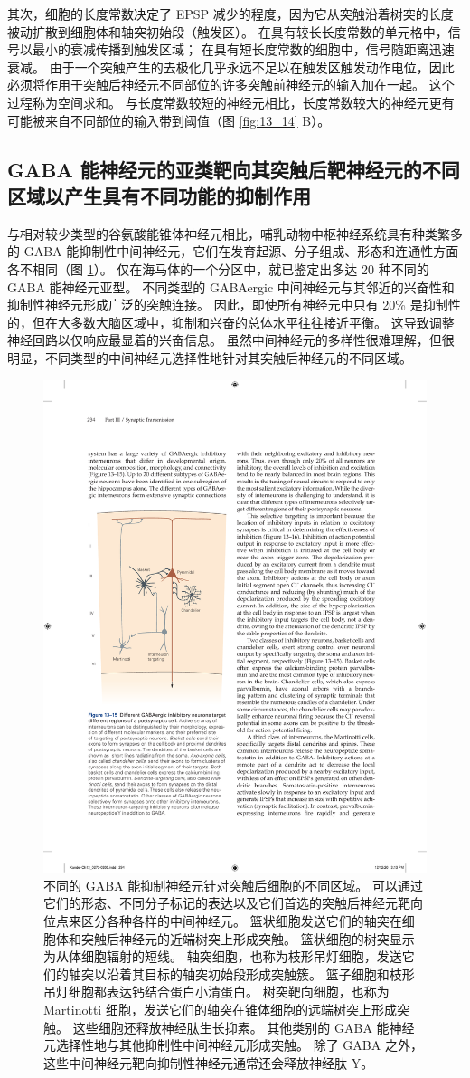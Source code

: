 其次，细胞的长度常数决定了 EPSP 减少的程度，因为它从突触沿着树突的长度被动扩散到细胞体和轴突初始段（触发区）。 
在具有较长长度常数的单元格中，信号以最小的衰减传播到触发区域； 在具有短长度常数的细胞中，信号随距离迅速衰减。 
由于一个突触产生的去极化几乎永远不足以在触发区触发动作电位，因此必须将作用于突触后神经元不同部位的许多突触前神经元的输入加在一起。 
这个过程称为空间求和。 
与长度常数较短的神经元相比，长度常数较大的神经元更有可能被来自不同部位的输入带到阈值（图 \ref{fig:13_14} B）。


\subsection{GABA 能神经元的亚类靶向其突触后靶神经元的不同区域以产生具有不同功能的抑制作用}

与相对较少类型的谷氨酸能锥体神经元相比，哺乳动物中枢神经系统具有种类繁多的 GABA 能抑制性中间神经元，它们在发育起源、分子组成、形态和连通性方面各不相同（图 \ref{fig:13_15}）。 
仅在海马体的一个分区中，就已鉴定出多达 20 种不同的 GABA 能神经元亚型。 
不同类型的 GABAergic 中间神经元与其邻近的兴奋性和抑制性神经元形成广泛的突触连接。 
因此，即使所有神经元中只有 20\% 是抑制性的，但在大多数大脑区域中，抑制和兴奋的总体水平往往接近平衡。 
这导致调整神经回路以仅响应最显着的兴奋信息。 
虽然中间神经元的多样性很难理解，但很明显，不同类型的中间神经元选择性地针对其突触后神经元的不同区域。

\begin{figure}[htbp]
	\centering
	\includegraphics[width=0.5\linewidth]{chap13/fig_13_15}
	\caption{不同的 GABA 能抑制神经元针对突触后细胞的不同区域。 可以通过它们的形态、不同分子标记的表达以及它们首选的突触后神经元靶向位点来区分各种各样的中间神经元。 篮状细胞发送它们的轴突在细胞体和突触后神经元的近端树突上形成突触。 篮状细胞的树突显示为从体细胞辐射的短线。 轴突细胞，也称为枝形吊灯细胞，发送它们的轴突以沿着其目标的轴突初始段形成突触簇。 篮子细胞和枝形吊灯细胞都表达钙结合蛋白小清蛋白。 树突靶向细胞，也称为 Martinotti 细胞，发送它们的轴突在锥体细胞的远端树突上形成突触。 这些细胞还释放神经肽生长抑素。 其他类别的 GABA 能神经元选择性地与其他抑制性中间神经元形成突触。 除了 GABA 之外，这些中间神经元靶向抑制性神经元通常还会释放神经肽 Y。}
	\label{fig:13_15}
\end{figure}


